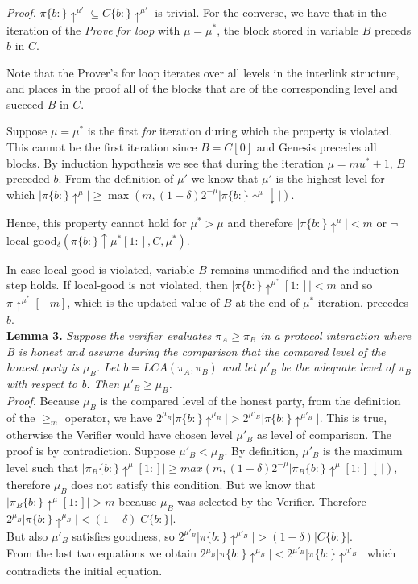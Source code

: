 \documentclass[11pt,a4paper]{article}
\begin{document}
\textit{Proof.} $ \pi\{b:\}\uparrow^{\mu'} \subseteq C\{b:\}\uparrow^{\mu'}$ is trivial. For the converse, we have that in the iteration of the \emph{Prove for loop}\cite{NIPoPoWs} with $\mu = \mu^*$, the block stored in variable $B$ preceds $b$ in $C$.

Note that the Prover's for loop iterates over all levels in the interlink structure, and places in the proof all of the blocks that are of the corresponding level and succeed $B$ in $C$. 

Suppose $\mu = \mu^*$ is the first \emph{for} iteration during which the property is violated. This cannot be the first iteration since $B = C[0]$ and Genesis precedes all blocks. By induction hypothesis we see that during the iteration $\mu = mu^* + 1$, $B$ preceded $b$. From the definition of $\mu'$ we know that $\mu'$ is the highest level for which $\vert \pi\{b:\}\uparrow^{\mu} \vert \geq \max( m, (1-\delta)2^{-\mu} \vert \pi\{b:\}\uparrow^{\mu}\downarrow \vert ) $. 

Hence, this property cannot hold for $\mu^* > \mu$ and therefore $\vert \pi\{b:\}\uparrow^{\mu} \vert < m$ or $\neg$local-good$_\delta(\pi\{b: \}\uparrow \mu^*[1:], C, \mu^*)$.

In case local-good is violated, variable $B$ remains unmodified and the induction step holds. If local-good is not violated, then $ \vert \pi\{b:\} \uparrow^{\mu^*}[1:] \vert < m$ and so $\pi\uparrow^{\mu^*}[-m]$, which is the updated value of $B$ at the end of $\mu^*$ iteration, precedes $b$.\\

\textbf{Lemma 3.} \textit{Suppose the verifier evaluates $\pi_A \geq \pi_B$ in a protocol interaction where B is honest and assume during the comparison that the compared level of the honest party is $\mu_B$. Let $b = LCA(\pi_A, \pi_B)$ and let ${\mu}'_B$ be the adequate level of $\pi_B$ with respect to b. Then ${\mu}'_B \geq \mu_B$.}\\

\textit{Proof.} Because $\mu_B$ is the compared level of the honest party, from the definition of the $\geq_m$ operator, we have $2^{\mu_B} \vert \pi\{b:\}\uparrow^{\mu_B} \vert > 2^{{\mu}'_B} \vert \pi\{b:\}\uparrow^{{\mu}'_B} \vert $. This is true, otherwise the Verifier would have chosen level $\mu'_B$ as level of comparison. The proof is by contradiction. Suppose $\mu'_B < \mu_B$. 
By definition, $\mu'_B$ is the maximum level such that $\vert \pi_B\{b:\}\uparrow^\mu [1:] \vert \geq max(m, (1-\delta)2^{-\mu}\vert \pi_B\{b:\}\uparrow^\mu [1:]\downarrow \vert)$, 
therefore $\mu_B$ does not satisfy this condition. 
But we know that $\vert \pi_B\{b:\}\uparrow^\mu [1:] \vert > m$ because $\mu_B$ was selected by the Verifier. 
Therefore $ 2^{\mu_B} \vert \pi\{b:\}\uparrow^{\mu_B} \vert < (1-\delta)\vert C\{b:\}\vert $. \\
But also $\mu'_B$ satisfies goodness, so $ 2^{\mu'_B} \vert \pi\{b:\}\uparrow^{\mu'_B} \vert > (1-\delta)\vert C\{b:\}\vert $.\\ From the last two equations we obtain $ 2^{\mu_B} \vert \pi\{b:\}\uparrow^{\mu_B} \vert < 2^{\mu'_B} \vert \pi\{b:\}\uparrow^{\mu'_B} \vert$ which contradicts the initial equation.\\
\end{document}

